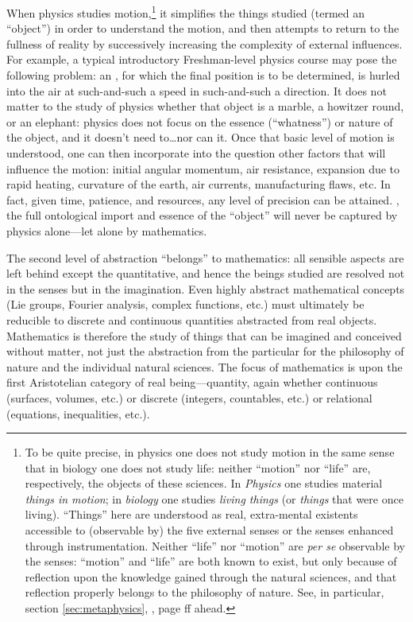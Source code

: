 When physics studies motion,\footnote{To be quite precise, in physics one does not study motion in the same sense that in biology one does not study life: neither “motion” nor “life” are, respectively, the objects of these sciences. In \textit{Physics} one studies material \textit{things in motion}; in \textit{biology} one studies \textit{living things} (or \textit{things} that were once living). ``Things'' here are understood as real, extra-mental existents accessible to (observable by) the five external senses or the senses enhanced through instrumentation. Neither “life” nor “motion” are \textit{per se} observable by the senses: ``motion'' and ``life'' are both known to exist, but only because of reflection upon the knowledge gained through the natural sciences, and that reflection properly belongs to the philosophy of nature. See, in particular, section \ref{sec:metaphysics}, , page \pageref{page:motion}ff ahead.} it simplifies the things studied (termed an ``object'') in order to understand the motion, and then attempts to return to the fullness of reality by successively increasing the complexity of external influences. For example, a typical introductory Freshman-level physics course may pose the following problem: an , for which the final position is to be determined, is hurled into the air at such-and-such a speed in such-and-such a direction. It does not matter to the study of physics whether that object is a marble, a howitzer round, or an elephant: physics does not focus on the essence (``whatness'') or nature of the object, and it doesn't need to\ldots nor can it. Once that basic level of motion is understood, one can then incorporate into the question other factors that will influence the motion: initial angular momentum, air resistance, expansion due to rapid heating, curvature of the earth, air currents, manufacturing flaws, etc. In fact, given time, patience, and resources, any level of precision can be attained. , the full ontological import and essence of the ``object'' will never be captured by physics alone---let alone by mathematics.

The second level of abstraction ``belongs'' to mathematics: all sensible aspects are left behind except the quantitative, and hence the beings studied are resolved not in the senses but in the imagination. Even highly abstract mathematical concepts (Lie groups, Fourier analysis, complex functions, etc.) must ultimately be reducible to discrete and continuous quantities abstracted from real objects. Mathematics is therefore the study of things that can be imagined and conceived without matter, not just the abstraction from the particular for the philosophy of nature and the individual natural sciences. The focus of mathematics is upon the first Aristotelian category of real being---quantity, again whether continuous (surfaces, volumes, etc.) or discrete (integers, countables, etc.) or relational (equations, inequalities, etc.).

